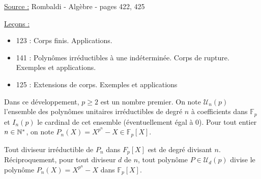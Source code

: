
\renewcommand{\L}{\mathbb{L}}
\renewcommand{\F}{\mathbb{F}}
\newcommand{\U}{\mathcal{U}}
\newcommand{\D}{\mathcal{D}}

\pagestyle{fancy}

\fancyhead[C]{}
\fancyhead[R]{}



\underline{Source :} Rombaldi - Algèbre - pages 422, 425

\underline{Leçons :}
\begin{itemize}
\item  123 : Corps finis. Applications.
\item   141 : Polynômes irréductibles à une indéterminée. Corps de rupture. Exemples et applications.
\item   125 : Extensions de corps. Exemples et applications

\end{itemize}

\begin{nota}
Dans ce développement, $p \geq 2$ est un nombre premier.
On note $\U_n(p)$ l'ensemble des polynômes unitaires irréductibles de degré $n$ à coefficients dans $\F_p$
et $I_n(p)$ le cardinal de cet ensemble (éventuellement égal à 0).
Pour tout entier $n \in \mathbb{N}^\ast$, on note $P_n(X) = X^{p^n} - X \in \F_p[X]$.
\end{nota}

\begin{lem}
\label{lem:PdivPn}
Tout diviseur irréductible de $P_n$ dans $F_p[X]$ est de degré divisant $n$.
Réciproquement, pour tout diviseur $d$ de $n$, tout polynôme $P \in \U_d(p)$ divise le polynôme $P_n(X) = X^{p^n} - X$ 
dans $\F_p[X]$.
\end{lem}

